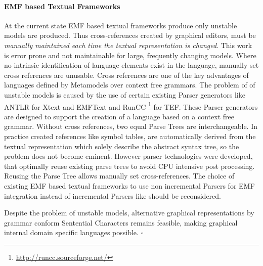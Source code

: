 \paragraph{EMF based Textual Frameworks}
At the current state EMF based textual frameworks produce only unstable models are produced. Thus cross-references created by graphical editors, must be \emph{manually maintained each time the textual representation is changed}. This work is error prone and not maintainable for large, frequently changing models. Where no intrinsic identification of language elements exist in the language, manually set cross references are unusable. Cross references are one of the key advantages of languages defined by Metamodels over context free grammars. The problem of of unstable models is caused by the use of certain existing Parser generators like ANTLR for Xtext and EMFText and RunCC \footnote{\raggedright \url{http://runcc.sourceforge.net/}} for TEF. These Parser generators are designed to support the creation of a language based on a context free grammar.
Without cross references, two equal Parse Trees are interchangeable. In practice created references like symbol tables, are automatically derived from the textual representation which solely describe the abstract syntax tree, so the problem does not become eminent. However parser technologies were developed, that optimally reuse existing parse trees to avoid CPU intensive post processing. Reusing the Parse Tree allows manually set cross-references. The choice of existing EMF based textual frameworks to use non incremental Parsers for EMF integration instead of incremental Parsers like \cite{xglr} should be reconsidered.

Despite the problem of unstable models, alternative graphical representations by grammar conform Sentential Characters remains feasible, making graphical internal domain specific languages possible. 
$\square$
